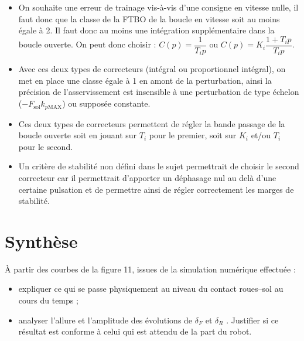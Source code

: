 \documentclass[11pt]{article}
\begin{document}
\begin{UPSTIcorrige}
\begin{itemize}
\item On souhaite une erreur de trainage vis-à-vis d'une consigne en vitesse nulle, il faut donc que la classe de la FTBO de la boucle en vitesse soit au moins égale à 2. Il faut donc au moins une intégration supplémentaire dans la boucle ouverte. On peut donc choisir : $C(p)=\dfrac{1}{T_ip}$ ou $C(p)=K_i\dfrac{1+T_ip}{T_ip}$.
\item Avec ces deux types de correcteurs (intégral ou proportionnel intégral), on met en place une classe égale à 1 en amont de la perturbation, ainsi la précision de l'asservissement est insensible à une perturbation de type échelon ($-F_{\text{sol}}k_{p\text{MAX}}$) ou supposée constante.
\item Ces deux types de correcteurs permettent de régler la bande passage de la boucle ouverte soit en jouant sur $T_i$ pour le premier, soit sur $K_i$ et/ou $T_i$ pour le second. 
\item Un critère de stabilité non défini dans le sujet permettrait de choisir le second correcteur car il permettrait d'apporter un déphasage nul au delà d'une certaine pulsation et de permettre ainsi de régler correctement les marges de stabilité.
\end{itemize}
\end{UPSTIcorrige}



\section{Synthèse}


\UPSTIquestion  À partir des courbes de la figure 11, issues de la simulation numérique effectuée :
\begin{itemize}
\item expliquer ce qui se passe physiquement au niveau du contact roues–sol au cours du temps ;
\item analyser l’allure et l’amplitude des évolutions de $\delta_F$ et $\delta_R$ . Justifier si ce résultat est conforme à celui qui est attendu de la part du robot.
\end{itemize}
\end{document}
